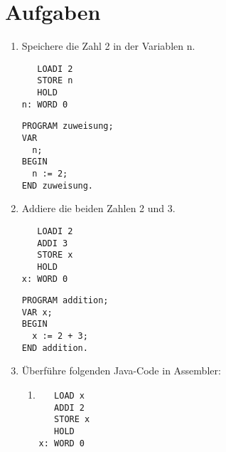 \documentclass{lehramt-informatik-haupt}
\begin{document}
\section{Aufgaben}

\begin{enumerate}

%

\item Speichere die Zahl 2 in der Variablen n.

\begin{multicols}{2}
\begin{verbatim}
   LOADI 2
   STORE n
   HOLD
n: WORD 0
\end{verbatim}

\columnbreak

\begin{verbatim}
PROGRAM zuweisung;
VAR
  n;
BEGIN
  n := 2;
END zuweisung.
\end{verbatim}
\end{multicols}

%

\item Addiere die beiden Zahlen 2 und 3.

\begin{multicols}{2}
\begin{verbatim}
   LOADI 2
   ADDI 3
   STORE x
   HOLD
x: WORD 0
\end{verbatim}

\columnbreak

\begin{verbatim}
PROGRAM addition;
VAR x;
BEGIN
  x := 2 + 3;
END addition.
\end{verbatim}

\end{multicols}

\item Überführe folgenden Java-Code in Assembler:

\begin{enumerate}

%

\item {}

\begin{multicols}{2}
\begin{verbatim}
   LOAD x
   ADDI 2
   STORE x
   HOLD
x: WORD 0
\end{verbatim}

\columnbreak


\end{multicols}
\end{enumerate}
\end{enumerate}
\end{document}
